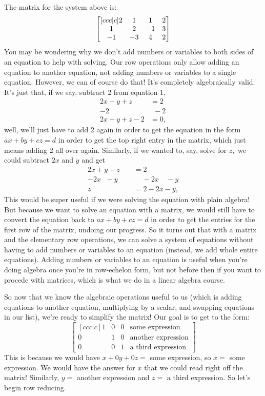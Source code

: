 \documentclass[12pt]{scrartcl}
\begin{document}
The matrix for the system above is:
\setlength\arraycolsep{8pt}
\def\arraystretch{1.4}
\[\bmat[ccc|c] 2 & 1 & 1 & 2 \\ 1 & 2 & -1 & 3 \\ -1 & -3 & 4 & 2 \emat\]
You may be wondering why we don't add numbers  or variables to both sides of an equation to help with solving. Our row operations only allow adding an equation to another equation, not adding numbers or variables to a single equation. However, we can of course do that! It's completely algebraically valid. It's just that, if we say, subtract 2 from equation 1,
\begin{align*}
    2x + y + z &= 2\\
    -2 \quad \: &\:\:-2 \\
    2x + y + z - 2 &= 0,
\end{align*}
well, we'll just have to add 2 again in order to get the equation in the form $ax + by + cz = d$ in order to get the top right entry in the matrix, which just means adding 2 all over again. Similarly, if we wanted to, say, solve for $z,$ we could subtract $2x$ and $y$ and get
\begin{align*}
    2x + y + z &= 2\\
    \text{$-$}2x \:\:\, \text{$-$}y\quad\:\: &\quad \: \text{$-$}2x \quad \text{$-$}y \\
   z &= 2 - 2x - y,
\end{align*}
This would be super useful if we were solving the equation with plain algebra! But because we want to solve an equation with a matrix, we would still have to convert the equation back to $ax + by + cz = d$ in order to get the entries for the first row of the matrix, undoing our progress. So it turns out that with a matrix and the elementary row operations, we can solve a system of equations without having to add numbers or variables to an equation (instead, we add whole entire equations). Adding numbers or variables to an equation is useful when you're doing algebra once you're in row-echelon form, but not before then if you want to procede with matrices, which is what we do in a linear algebra course.

So now that we know the algebraic operations useful to us (which is adding equations to another equation, multiplying by a scalar, and swapping equations in our list), we're ready to simplify the matrix! Our goal is to get to the form:
\[\begin{bmatrix}[ccc|c]
    1 & 0 & 0 & \text{some expression} \\
    0 & 1 & 0 & \text{another expression} \\
    0 & 0 & 1 & \text{a third expression}
\end{bmatrix}\]
This is because we would have $x + 0y + 0z =$ some expression, so $x =$ some expression. We would have the answer for $x$ that we could read right off the matrix! Similarly, $y =$ another expression and $z =$ a third expression. So let's begin row reducing.
\end{document}
